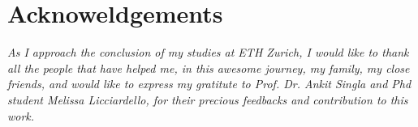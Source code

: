 \chapter{Acknoweldgements}\label{sec:acknowledgements}

\emph{As I approach the conclusion of my studies at ETH Zurich, I would like to thank all the people that have helped me, in this awesome journey, my family, my close friends, and would like to express my gratitute to Prof. Dr. Ankit Singla and Phd student Melissa Licciardello, for their precious feedbacks and contribution to this work.}
